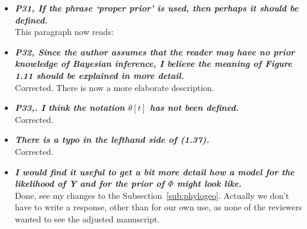 \documentclass[english]{article}
\begin{document}
\begin{itemize}
\item {
{\it
\textbf{
P31, If the phrase `proper prior' is used, then perhaps it should be defined.
}%
}%
}%
\\
This paragraph now reads:

\begin{quote}
\myeditsvnine
\end{quote}


\item {
{\it
\textbf{
P32, Since the author assumes that the reader may have no prior knowledge of Bayesian inference, I believe the meaning of Figure 1.11 should be explained in more detail.
}%
}%
}%
\\
Corrected. There is now a more elaborate description.



\item {
{\it
\textbf{
P33,. I think the notation $\theta[t]$ has not been defined.
}%
}%
}%
\\
Corrected.




\item {
{\it
\textbf{
There is a typo in the lefthand side of (1.37).
}%
}%
}%
\\
Corrected.


\item {
{\it
\textbf{
I would find it useful to get a bit more detail how a model for the likelihood of Y and for the prior of $\Phi$ might look like.
}%
}%
}%
\\
Done, see my changes to the Subsection~\ref{sub:phylogeo}. Actually we don't have to write a response, other than for our own use, as none of the reviewers wanted to see the adjusted manuscript. 




\end{itemize}
\end{document}

